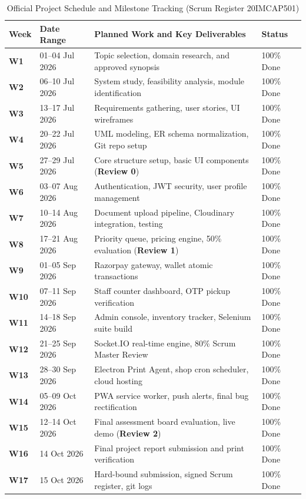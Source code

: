 \documentclass[12pt,a4paper,oneside]{report}
\begin{document}
\begin{table}[H]
\centering
\small
\begin{tabularx}{\textwidth}{|p{0.55in}|p{0.95in}|X|p{0.65in}|}
\hline
\textbf{Week} & \textbf{Date Range} & \textbf{Planned Work and Key Deliverables} & \textbf{Status} \\ \hline
\textbf{W1} & 01--04 Jul 2026 & Topic selection, domain research, and approved synopsis & 100\% Done \\ \hline
\textbf{W2} & 06--10 Jul 2026 & System study, feasibility analysis, module identification & 100\% Done \\ \hline
\textbf{W3} & 13--17 Jul 2026 & Requirements gathering, user stories, UI wireframes & 100\% Done \\ \hline
\textbf{W4} & 20--22 Jul 2026 & UML modeling, ER schema normalization, Git repo setup & 100\% Done \\ \hline
\textbf{W5} & 27--29 Jul 2026 & Core structure setup, basic UI components (\textbf{Review 0}) & 100\% Done \\ \hline
\textbf{W6} & 03--07 Aug 2026 & Authentication, JWT security, user profile management & 100\% Done \\ \hline
\textbf{W7} & 10--14 Aug 2026 & Document upload pipeline, Cloudinary integration, testing & 100\% Done \\ \hline
\textbf{W8} & 17--21 Aug 2026 & Priority queue, pricing engine, 50\% evaluation (\textbf{Review 1}) & 100\% Done \\ \hline
\textbf{W9} & 01--05 Sep 2026 & Razorpay gateway, wallet atomic transactions & 100\% Done \\ \hline
\textbf{W10} & 07--11 Sep 2026 & Staff counter dashboard, OTP pickup verification & 100\% Done \\ \hline
\textbf{W11} & 14--18 Sep 2026 & Admin console, inventory tracker, Selenium suite build & 100\% Done \\ \hline
\textbf{W12} & 21--25 Sep 2026 & Socket.IO real-time engine, 80\% Scrum Master Review & 100\% Done \\ \hline
\textbf{W13} & 28--30 Sep 2026 & Electron Print Agent, shop cron scheduler, cloud hosting & 100\% Done \\ \hline
\textbf{W14} & 05--09 Oct 2026 & PWA service worker, push alerts, final bug rectification & 100\% Done \\ \hline
\textbf{W15} & 12--14 Oct 2026 & Final assessment board evaluation, live demo (\textbf{Review 2}) & 100\% Done \\ \hline
\textbf{W16} & 14 Oct 2026 & Final project report submission and print verification & 100\% Done \\ \hline
\textbf{W17} & 15 Oct 2026 & Hard-bound submission, signed Scrum register, git logs & 100\% Done \\ \hline
\end{tabularx}
\caption{Official Project Schedule and Milestone Tracking (Scrum Register 20IMCAP501)}
\label{tab:schedule}
\end{table}
\end{document}
